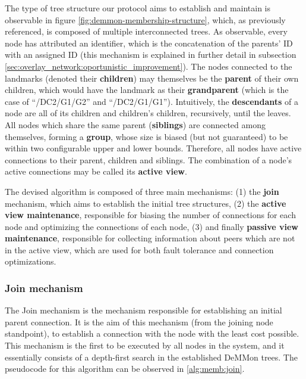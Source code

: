 The type of tree structure our protocol aims to establish and maintain is observable in figure \ref{fig:demmon-membership-structure}, which, as previously referenced, is composed of multiple interconnected trees. As observable, every node has attributed an identifier, which is the concatenation of the parents' ID with an assigned ID (this mechanism is explained in further detail in subsection \ref{sec:overlay_network:oportunistic_improvement}). The nodes connected to the landmarks (denoted their \textbf{children}) may themselves be the \textbf{parent} of their own children, which would have the landmark as their \textbf{grandparent} (which is the case of ``/DC2/G1/G2'' and ``/DC2/G1/G1''). Intuitively, the \textbf{descendants} of a node are all of its children and children's children, recursively, until the leaves. All nodes which share the same parent (\textbf{siblings}) are connected among themselves, forming a \textbf{group}, whose size is biased (but not guaranteed) to be within two configurable upper and lower bounds. Therefore, all nodes have active connections to their parent, children and siblings. The combination of a node's active connections may be called its \textbf{active view}. 

The devised algorithm is composed of three main mechanisms: (1) the \textbf{join} mechanism, which aims to establish the initial tree structures, (2) the \textbf{active view maintenance}, responsible for biasing the number of connections for each node and optimizing the connections of each node, (3)  and finally \textbf{passive view maintenance}, responsible for collecting information about peers which are not in the active view, which are used for both fault tolerance and connection optimizations.

\subsubsection{Join mechanism} \label{sec:overlay_network:join}

The Join mechanism is the mechanism responsible for establishing an initial parent connection. It is the aim of this mechanism (from the joining node standpoint), to establish a connection with the node with the least cost possible. This mechanism is the first to be executed by all nodes in the system, and it essentially consists of a depth-first search in the established DeMMon trees. The pseudocode for this algorithm can be observed in \ref{alg:memb:join}. 




